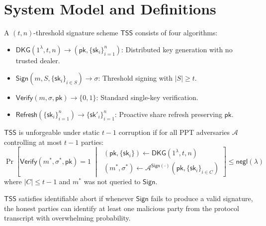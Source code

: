 \section{System Model and Definitions}

\label{sec:model}

\begin{definition}
\label{def:tss}
A $(t,n)$-threshold signature scheme $\mathsf{TSS}$ consists of four algorithms:
\begin{itemize}[nosep]
  \item $\mathsf{DKG}(1^\lambda, t, n) \to (\mathsf{pk}, \{\mathsf{sk}_i\}_{i=1}^n)$:
    Distributed key generation with no trusted dealer.
  \item $\mathsf{Sign}(m, S, \{\mathsf{sk}_i\}_{i \in S}) \to \sigma$: Threshold
    signing with $|S| \geq t$.
  \item $\mathsf{Verify}(m, \sigma, \mathsf{pk}) \to \{0,1\}$: Standard single-key
    verification.
  \item $\mathsf{Refresh}(\{\mathsf{sk}_i\}_{i=1}^n) \to \{\mathsf{sk}'_i\}_{i=1}^n$:
    Proactive share refresh preserving $\mathsf{pk}$.
\end{itemize}
\end{definition}

\begin{definition}
\label{def:uf}
$\mathsf{TSS}$ is unforgeable under static $t{-}1$ corruption if for all PPT
adversaries $\mathcal{A}$ controlling at most $t-1$ parties:
\[
  \Pr\!\left[
    \mathsf{Verify}(m^*, \sigma^*, \mathsf{pk}) = 1
    \;\middle|\;
    \begin{array}{l}
      (\mathsf{pk}, \{\mathsf{sk}_i\}) \gets \mathsf{DKG}(1^\lambda, t, n) \\
      (m^*, \sigma^*) \gets \mathcal{A}^{\mathsf{Sign}(\cdot)}(\mathsf{pk}, \{\mathsf{sk}_i\}_{i \in C})
    \end{array}
  \right] \leq \mathsf{negl}(\lambda)
\]
where $|C| \leq t-1$ and $m^*$ was not queried to $\mathsf{Sign}$.
\end{definition}

\begin{definition}
\label{def:id-abort}
$\mathsf{TSS}$ satisfies identifiable abort if whenever $\mathsf{Sign}$ fails to
produce a valid signature, the honest parties can identify at least one malicious
party from the protocol transcript with overwhelming probability.
\end{definition}

